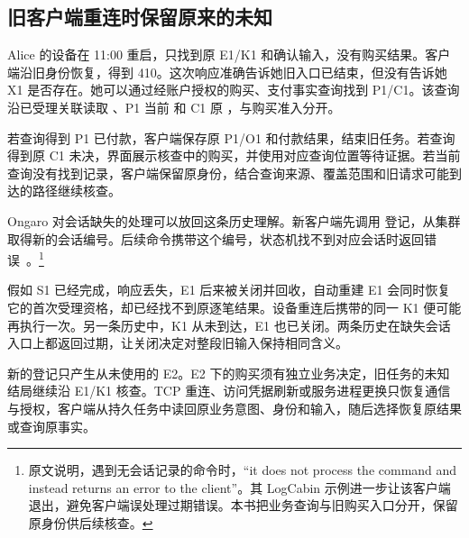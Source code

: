 \subsection*{旧客户端重连时保留原来的未知}

Alice 的设备在 11:00 重启，只找到原 E1/K1 和确认输入，没有购买结果。客户端沿旧身份恢复，得到 410。这次响应准确告诉她旧入口已结束，但没有告诉她 X1 是否存在。她可以通过经账户授权的购买、支付事实查询找到 P1/C1。该查询沿已受理关联读取 、P1 当前  和 C1 原 ，与购买准入分开。

若查询得到 P1 已付款，客户端保存原 P1/O1 和付款结果，结束旧任务。若查询得到原 C1 未决，界面展示核查中的购买，并使用对应查询位置等待证据。若当前查询没有找到记录，客户端保留原身份，结合查询来源、覆盖范围和旧请求可能到达的路径继续核查。

Ongaro 对会话缺失的处理可以放回这条历史理解。新客户端先调用  登记，从集群取得新的会话编号。后续命令携带这个编号，状态机找不到对应会话时返回错误~\cite{ongaro}。\footnote{原文说明，遇到无会话记录的命令时，“it does not process the command and instead returns an error to the client”。其 LogCabin 示例进一步让该客户端退出，避免客户端误处理过期错误。本书把业务查询与旧购买入口分开，保留原身份供后续核查。}

假如 S1 已经完成，响应丢失，E1 后来被关闭并回收，自动重建 E1 会同时恢复它的首次受理资格，却已经找不到原逐笔结果。设备重连后携带的同一 K1 便可能再执行一次。另一条历史中，K1 从未到达，E1 也已关闭。两条历史在缺失会话入口上都返回过期，让关闭决定对整段旧输入保持相同含义。


新的登记只产生从未使用的 E2。E2 下的购买须有独立业务决定，旧任务的未知结局继续沿 E1/K1 核查。TCP 重连、访问凭据刷新或服务进程更换只恢复通信与授权，客户端从持久任务中读回原业务意图、身份和输入，随后选择恢复原结果或查询原事实。
\FloatBarrier

